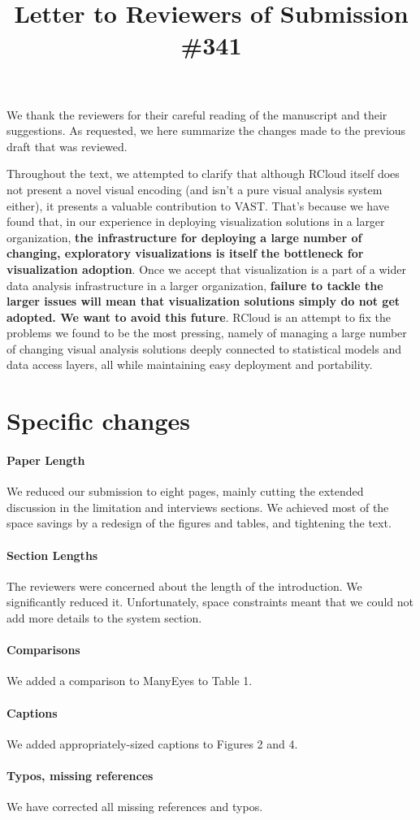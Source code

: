 \documentclass{article}
\title{Letter to Reviewers of Submission \#341}
\begin{document}
\maketitle

We thank the reviewers for their careful reading of the manuscript and
their suggestions. As requested, we here summarize the changes
made to the previous draft that was reviewed.

Throughout the text, we attempted to clarify that although RCloud
itself does not present a novel visual encoding (and isn't a pure
visual analysis system either), it presents a valuable contribution
to VAST. That's because we have found that, in
our experience in deploying visualization solutions in a larger
organization, \textbf{the infrastructure for deploying a large number of
changing, exploratory visualizations is itself the bottleneck for
visualization adoption}. Once we accept that visualization is a part
of a wider data analysis infrastructure in a larger organization,
\textbf{failure to tackle the larger issues will mean that visualization
solutions simply do not get adopted. We want to avoid this future}.
RCloud is an attempt to fix the problems we found to be the most
pressing, namely of managing a large number of changing visual
analysis solutions deeply connected to statistical models and data
access layers, all while maintaining easy deployment and portability.

\section*{Specific changes}

\paragraph*{Paper Length} We reduced our submission to eight pages,
mainly cutting the extended discussion in the limitation
and interviews sections. We achieved most of the space savings
by a redesign of the figures and tables, and tightening
the text.

\paragraph*{Section Lengths} The reviewers were concerned about the length
of the introduction. We significantly reduced it. Unfortunately,
space constraints meant that we could not add more details to the
system section.

\paragraph*{Comparisons} We added a comparison to ManyEyes to Table 1.

\paragraph*{Captions} We added appropriately-sized captions to Figures 2 and 4.

\paragraph*{Typos, missing references} We have corrected all missing references and typos.
\end{document}
